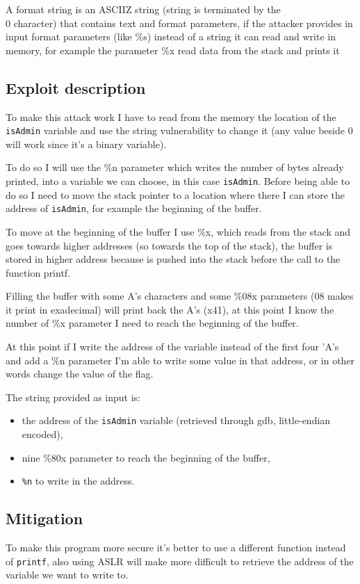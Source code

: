 \documentclass[a4paper,12pt]{article}
\begin{document}
A format string is an ASCIIZ string (string is terminated by the \\0 character) that contains text and format parameters, if the attacker provides in input format parameters (like \%s) instead of a string it can read and write in memory, for example the parameter \%x read data from the stack and prints it %

\subsection{Exploit description}

To make this attack work I have to read from the memory the location of the \texttt{isAdmin} variable and use the string vulnerability to change it (any value beside 0 will work since it's a binary variable). 

To do so I will use the \%n parameter which writes the number of bytes already printed, into a variable we can choose, in this case \texttt{isAdmin}. Before being able to do so I need to move the stack pointer to a location where there I can store the address of \texttt{isAdmin}, for example the beginning of the buffer.

To move at the beginning of the buffer I use \%x, which reads from the stack and goes towards higher addresses (so towards the top of the stack), the buffer is stored in higher address because is pushed into the stack before the call to the function printf.

Filling the buffer with some A's characters and some \%08x parameters (08 makes it print in exadecimal) will print back the A's (x41), at this point I know the number of \%x parameter I need to reach the beginning of the buffer.

At this point if I write the address of the variable instead of the first four 'A's and add a \%n parameter I'm able to write some value in that address, or in other words change the value of the flag.

The string provided as input is:
\begin{itemize}
\item the address of the \texttt{isAdmin} variable (retrieved through gdb, little-endian encoded),
\item nine \%80x parameter to reach the beginning of the buffer,
\item \texttt{\%n} to write in the address.
\end{itemize}


\subsection{Mitigation}

To make this program more secure it's better to use a different function instead of \texttt{printf}, also using ASLR will make more difficult to retrieve the address of the variable we want to write to. 
\end{document}
